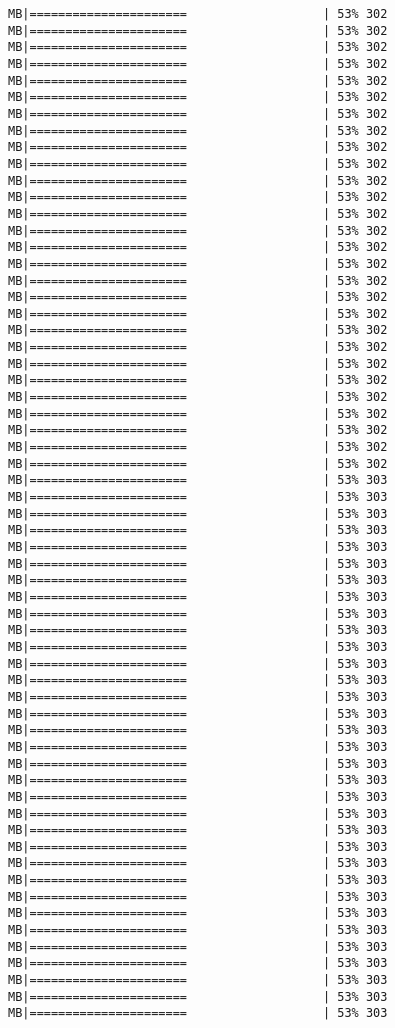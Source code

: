 \documentclass[
]{article}
\begin{document}
\begin{verbatim}
MB|======================                   | 53% 302 MB|======================                   | 53% 302 MB|======================                   | 53% 302 MB|======================                   | 53% 302 MB|======================                   | 53% 302 MB|======================                   | 53% 302 MB|======================                   | 53% 302 MB|======================                   | 53% 302 MB|======================                   | 53% 302 MB|======================                   | 53% 302 MB|======================                   | 53% 302 MB|======================                   | 53% 302 MB|======================                   | 53% 302 MB|======================                   | 53% 302 MB|======================                   | 53% 302 MB|======================                   | 53% 302 MB|======================                   | 53% 302 MB|======================                   | 53% 302 MB|======================                   | 53% 302 MB|======================                   | 53% 302 MB|======================                   | 53% 302 MB|======================                   | 53% 302 MB|======================                   | 53% 302 MB|======================                   | 53% 302 MB|======================                   | 53% 302 MB|======================                   | 53% 302 MB|======================                   | 53% 302 MB|======================                   | 53% 302 MB|======================                   | 53% 303 MB|======================                   | 53% 303 MB|======================                   | 53% 303 MB|======================                   | 53% 303 MB|======================                   | 53% 303 MB|======================                   | 53% 303 MB|======================                   | 53% 303 MB|======================                   | 53% 303 MB|======================                   | 53% 303 MB|======================                   | 53% 303 MB|======================                   | 53% 303 MB|======================                   | 53% 303 MB|======================                   | 53% 303 MB|======================                   | 53% 303 MB|======================                   | 53% 303 MB|======================                   | 53% 303 MB|======================                   | 53% 303 MB|======================                   | 53% 303 MB|======================                   | 53% 303 MB|======================                   | 53% 303 MB|======================                   | 53% 303 MB|======================                   | 53% 303 MB|======================                   | 53% 303 MB|======================                   | 53% 303 MB|======================                   | 53% 303 MB|======================                   | 53% 303 MB|======================                   | 53% 303 MB|======================                   | 53% 303 MB|======================                   | 53% 303 MB|======================                   | 53% 303 MB|======================                   | 53% 303 MB|======================                   | 53% 303 MB|======================                   | 53% 303 
\end{verbatim}
\end{document}
